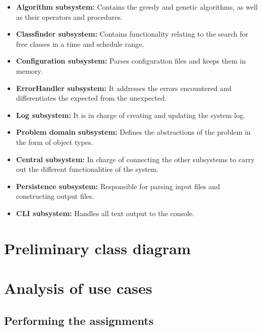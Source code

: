 \begin{itemize}

    \item \textbf{Algorithm subsystem:} Contains the greedy and genetic algorithms, as well as their operators and procedures.

    \item \textbf{Classfinder subsystem:} Contains functionality relating to the search for free classes in a time and schedule range.

    \item \textbf{Configuration subsystem:} Parses configuration files and keeps them in memory.

    \item \textbf{ErrorHandler subsystem:} It addresses the errors encountered and differentiates the expected from the unexpected.

    \item \textbf{Log subsystem:} It is in charge of creating and updating the system log.

    \item \textbf{Problem domain subsystem:} Defines the abstractions of the problem in the form of object types.

    \item \textbf{Central subsystem:} In charge of connecting the other subsystems to carry out the different functionalities of the system.

    \item \textbf{Persistence subsystem:} Responsible for parsing input files and constructing output files.

    \item \textbf{CLI subsystem:} Handles all text output to the console.

\end{itemize}



\section{Preliminary class diagram}



\section{Analysis of use cases}

\subsection{Performing the assignments}
